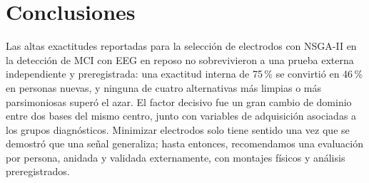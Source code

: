 \section{Conclusiones}

Las altas exactitudes reportadas para la selección de electrodos con NSGA-II en la detección de MCI con EEG en reposo no sobrevivieron a una prueba externa independiente y preregistrada: una exactitud interna de 75\,\% se convirtió en 46\,\% en personas nuevas, y ninguna de cuatro alternativas más limpias o más parsimoniosas superó el azar. El factor decisivo fue un gran cambio de dominio entre dos bases del mismo centro, junto con variables de adquisición asociadas a los grupos diagnósticos. Minimizar electrodos solo tiene sentido una vez que se demostró que una señal generaliza; hasta entonces, recomendamos una evaluación por persona, anidada y validada externamente, con montajes físicos y análisis preregistrados.
